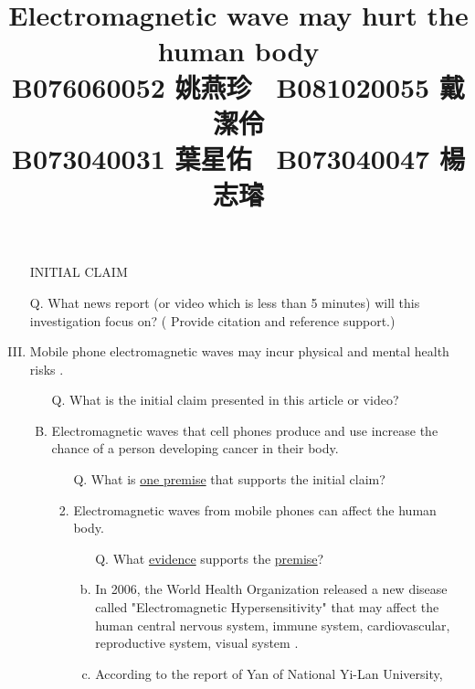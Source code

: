 \documentclass[a4paper, 12pt]{article}
\title{Electromagnetic wave may hurt the human body\\
\small
B076060052 姚燕珍 \ B081020055 戴潔伶\\
B073040031 葉星佑 \ B073040047 楊志璿
}
\date{}
\begin{document}
\begin{CJK*}{UTF8}{bsmi}
      \maketitle
      \begin{enumerate}[I.]
            \item[] {\color{blue}INITIAL CLAIM}
            \item[Q.] {What news report (or video which is less than 5 minutes) will this investigation focus on? (
                  Provide citation and reference support.)}
            \item Mobile phone electromagnetic waves may incur physical and mental health risks \parencite{AIA970701}. %
                  \begin{enumerate}[A.]
                        \item [Q.] What is the {\color{blue}initial claim} presented in this article or video?
                        \item Electromagnetic waves that cell phones produce and use increase the chance of a person developing
                              cancer in their body.
                              \begin{enumerate}[1.]
                                    \item[Q.] What is \underline{one premise} that supports the {\color{blue}initial claim}?
                                    \item Electromagnetic waves from mobile phones can affect the human body.
                                          \begin{enumerate}[a.]
                                                \item [Q.] What \underline{evidence} supports the \underline{premise}?
                                                \item In 2006, the World Health Organization released a new
                                                      disease called "Electromagnetic Hypersensitivity" that may
                                                      affect the human central nervous system, immune system,
                                                      cardiovascular, reproductive system, visual system \parencite{36069}.
                                                \item According to the report of Yan of National Yi-Lan University,

\end{enumerate}
\end{enumerate}
\end{enumerate}
\end{enumerate}
\end{CJK*}
\end{document}
